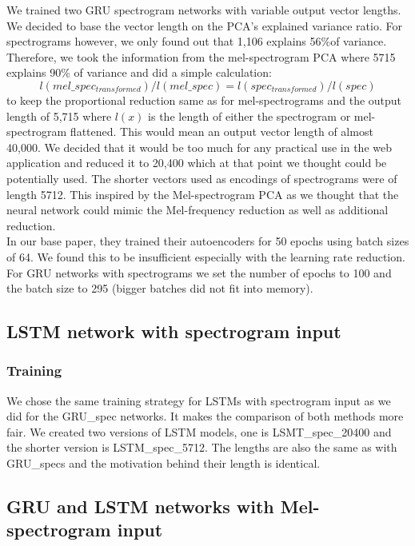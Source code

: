We trained two GRU spectrogram networks with variable output vector lengths. We decided to base the vector length on the PCA's explained variance ratio. For spectrograms however, we only found out that 1,106 explains 56\%of variance. Therefore, we took the information from the mel-spectrogram PCA where 5715 explains 90\% of variance and did a simple calculation: $$ l(mel\_spec_{transformed})/l(mel\_spec) = l(spec_{transformed})/l(spec) $$ to keep the proportional reduction same as for mel-spectrograms and the output length of 5,715 where $l(x)$ is the length of either the spectrogram or mel-spectrogram flattened. This would mean an output vector length of almost 40,000. We decided that it would be too much for any practical use in the web application and reduced it to 20,400 which at that point we thought could be potentially used. The shorter vectors used as encodings of spectrograms were of length 5712. This inspired by the Mel-spectrogram PCA as we thought that the neural network could mimic the Mel-frequency reduction as well as additional reduction. \\
In our base paper, they trained their autoencoders for 50 epochs using batch sizes of 64. We found this to be insufficient especially with the learning rate reduction. For GRU networks with spectrograms we set the number of epochs to 100 and the batch size to 295 (bigger batches did not fit into memory). 

\subsection{LSTM network with spectrogram input}\label{ssec:LSTM_spec_experiments}

\subsubsection{Training}
We chose the same training strategy for LSTMs with spectrogram input as we did for the GRU\_spec networks. It makes the comparison of both methods more fair. We created two versions of LSTM models, one is LSMT\_spec\_20400 and the shorter version is LSTM\_spec\_5712. The lengths are also the same as with GRU\_specs and the motivation behind their length is identical.

\subsection{GRU and LSTM networks with Mel-spectrogram input}\label{ssec:GRU_LSTM_mel_experiments}

